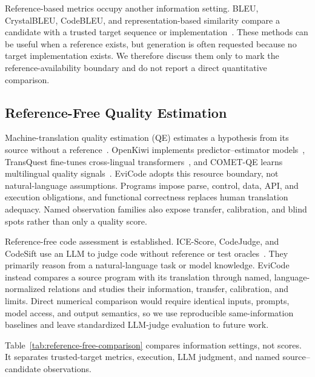 \documentclass[conference]{IEEEtran}
\begin{document}
Reference-based metrics occupy another information setting. BLEU, CrystalBLEU, CodeBLEU, and representation-based similarity compare a candidate with a trusted target sequence or implementation~\cite{papineni2002bleu,eghbali2022crystalbleu,ren2020codebleu,zhang2020bertscore}. These methods can be useful when a reference exists, but generation is often requested because no target implementation exists. We therefore discuss them only to mark the reference-availability boundary and do not report a direct quantitative comparison.

\subsection{Reference-Free Quality Estimation}
Machine-translation quality estimation (QE) estimates a hypothesis from its source without a reference~\cite{fonseca2019wmtqe,blain2023wmtqe}. OpenKiwi implements predictor--estimator models~\cite{kepler2019openkiwi}, TransQuest fine-tunes cross-lingual transformers~\cite{ranasinghe2020transquest}, and COMET-QE learns multilingual quality signals~\cite{rei2022cometkiwi,rei2023scalingcometkiwi}. EviCode adopts this resource boundary, not natural-language assumptions. Programs impose parse, control, data, API, and execution obligations, and functional correctness replaces human translation adequacy. Named observation families also expose transfer, calibration, and blind spots rather than only a quality score.

Reference-free code assessment is established. ICE-Score, CodeJudge, and CodeSift use an LLM to judge code without reference or test oracles~\cite{zhuo2024icescore,tong2024codejudge,aggarwal2024codesift}. They primarily reason from a natural-language task or model knowledge. EviCode instead compares a source program with its translation through named, language-normalized relations and studies their information, transfer, calibration, and limits. Direct numerical comparison would require identical inputs, prompts, model access, and output semantics, so we use reproducible same-information baselines and leave standardized LLM-judge evaluation to future work.

Table~\ref{tab:reference-free-comparison} compares information settings, not scores. It separates trusted-target metrics, execution, LLM judgment, and named source--candidate observations.
\end{document}
